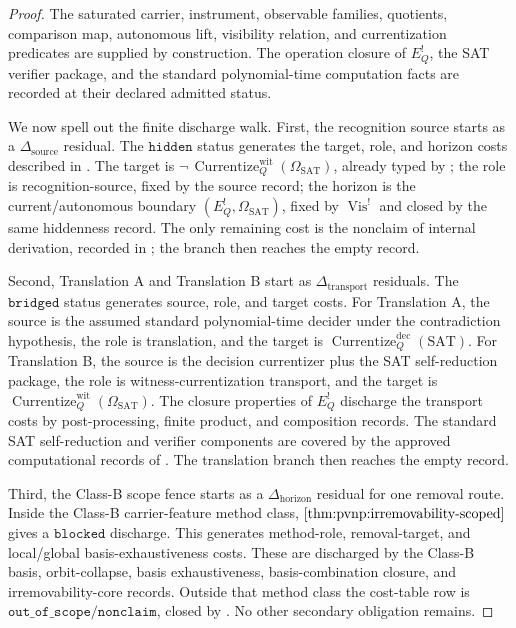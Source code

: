 \documentclass[11pt]{article}
\newcommand{\EQbang}{E^{!}_{Q}}
\newcommand{\OmegaSAT}{\Omega_{\mathrm{SAT}}}
\newcommand{\VisBang}{\operatorname{Vis}^{!}}
\newcommand{\CurrentizeDec}{\operatorname{Currentize}^{\mathrm{dec}}_{Q}}
\newcommand{\CurrentizeWit}{\operatorname{Currentize}^{\mathrm{wit}}_{Q}}
\theoremstyle{definition}
\begin{document}
\begin{proof}
The saturated carrier, instrument, observable families, quotients,
comparison map, autonomous lift, visibility relation, and
currentization predicates are supplied by construction.  The
operation closure of \(\EQbang\), the SAT verifier package, and the
standard polynomial-time computation facts are recorded at their
declared admitted status.

We now spell out the finite discharge walk.  First, the recognition
source starts as a \(\Delta_{\mathrm{source}}\) residual.  The
\(\texttt{hidden}\) status generates the target, role, and horizon
costs described in
.  The target is
\(\neg\,\CurrentizeWit(\OmegaSAT)\), already typed by
; the role is recognition-source, fixed
by the source record; the horizon is the current/autonomous boundary
\((\EQbang,\OmegaSAT)\), fixed by \(\VisBang\) and closed by the
same hiddenness record.  The only remaining cost is the nonclaim of
internal derivation, recorded in
; the branch then reaches the
empty record.

Second, Translation A and Translation B start as
\(\Delta_{\mathrm{transport}}\) residuals.  The
\(\texttt{bridged}\) status generates source, role, and target costs.
For Translation A, the source is the assumed standard
polynomial-time decider under the contradiction hypothesis, the role
is translation, and the target is \(\CurrentizeDec(\mathrm{SAT})\).
For Translation B, the source is the decision currentizer plus the
SAT self-reduction package, the role is witness-currentization
transport, and the target is \(\CurrentizeWit(\OmegaSAT)\).  The
closure properties of \(\EQbang\) discharge the transport costs by
post-processing, finite product, and composition records.  The
standard SAT self-reduction and verifier components are covered by
the approved computational records of
.  The translation branch then
reaches the empty record.

Third, the Class-B scope fence starts as a \(\Delta_{\mathrm{horizon}}\)
residual for one removal route.  Inside the Class-B carrier-feature
method class, \(\Cref{thm:pvnp:irremovability-scoped}\) gives a
\(\texttt{blocked}\) discharge.  This generates method-role,
removal-target, and local/global basis-exhaustiveness costs.  These
are discharged by the Class-B basis, orbit-collapse, basis
exhaustiveness, basis-combination closure, and irremovability-core
records.  Outside that method class the cost-table row is
\(\texttt{out\_of\_scope}/\texttt{nonclaim}\), closed by
.  No other secondary
obligation remains.


\end{proof}
\end{document}
